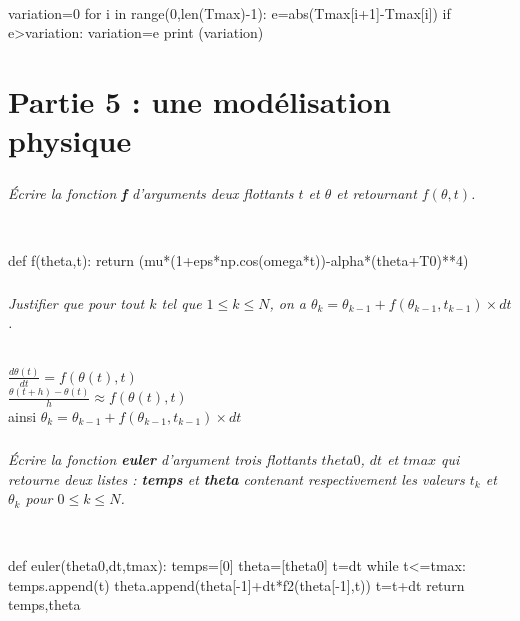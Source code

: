 \documentclass[10pt,fleqn]{article} %
\begin{document}
\ifprof
\begin{corrige}~\
\begin{python}
variation=0
for i in range(0,len(Tmax)-1):
    e=abs(Tmax[i+1]-Tmax[i])
    if e>variation:
        variation=e
print (variation)
\end{python}
\end{corrige}
\else
\fi
 

\section*{Partie 5 : une modélisation physique}

\subparagraph{}
\textit{Écrire la  fonction \textbf{f} d'arguments deux flottants $t$ et $\theta$ et retournant 
$f(\theta,t)$.}

\ifprof
\begin{corrige}~\
\begin{python}
def f(theta,t):
    return (mu*(1+eps*np.cos(omega*t))-alpha*(theta+T0)**4)
\end{python}
\end{corrige}
\else
\fi

\subparagraph{} 
\textit{Justifier que pour tout $k$ tel que $1 \leq k \leq N$, on a 
$\theta_{k}=\theta_{k-1}+f(\theta_{k-1},t_{k-1}) \times dt$.}

\ifprof
\begin{corrige}~\\
$\frac{d\theta(t)}{dt} =f(\theta(t),t)$\\
$\frac{\theta(t+h)-\theta(t)}{h} \approx f(\theta(t),t)$\\
ainsi $\theta_{k}=\theta_{k-1}+f(\theta_{k-1},t_{k-1}) \times dt$
\end{corrige}
\else
\fi

\subparagraph{} 
\textit{Écrire la fonction \textbf{euler} d'argument trois flottants $theta0$, $dt$ et $tmax$ qui retourne 
deux listes : \textbf{temps} et \textbf{theta} contenant respectivement les valeurs 
$t_k$ et $\theta_k$ pour $0\leq k \leq N$.}

\ifprof
\begin{corrige}~\
\begin{python}
def euler(theta0,dt,tmax):
    temps=[0]
    theta=[theta0]
    t=dt
    while t<=tmax:
        temps.append(t)
        theta.append(theta[-1]+dt*f2(theta[-1],t))
        t=t+dt
    return temps,theta
\end{python}
\end{corrige}
\else
\fi
\end{document}
